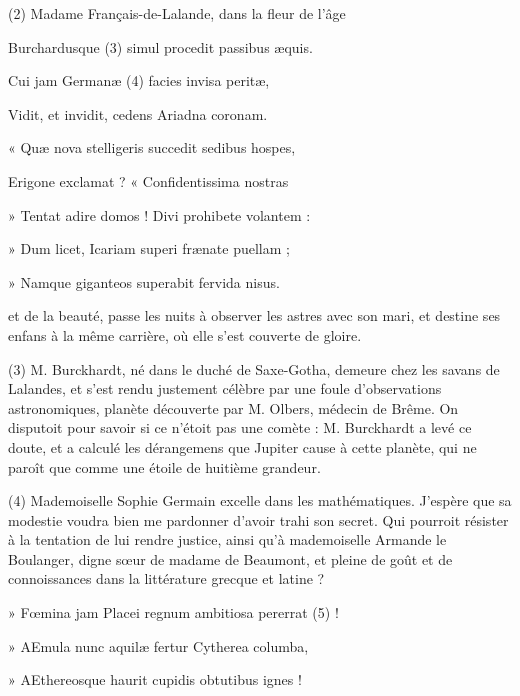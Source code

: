 \documentclass[11pt,a4paper]{article}
\begin{document}
(2) Madame Français-de-Lalande, dans la fleur de l'âge


Burchardusque (3) simul procedit passibus æquis.

Cui jam Germanæ (4) facies invisa peritæ,

Vidit, et invidit, cedens Ariadna coronam.

« Quæ nova stelligeris succedit sedibus hospes,

Erigone exclamat ? « Confidentissima nostras

» Tentat adire domos ! Divi prohibete volantem :

» Dum licet, Icariam superi frænate puellam ;

» Namque giganteos superabit fervida nisus.


et de la beauté, passe les nuits à observer les astres avec son mari, et destine ses enfans à la même carrière, où elle s'est couverte de gloire.

(3) M. Burckhardt, né dans le duché de Saxe-Gotha, demeure chez les savans de Lalandes, et s'est rendu justement célèbre par une foule d'observations astronomiques,  planète découverte par M. Olbers, médecin de Brême. On disputoit pour savoir si ce n'étoit pas une comète : M. Burckhardt a levé ce doute, et a calculé les dérangemens que Jupiter cause à cette planète, qui ne paroît que comme une étoile de huitième grandeur.

(4) Mademoiselle Sophie Germain excelle dans les mathématiques. J'espère que sa modestie voudra bien me pardonner d'avoir trahi son secret. Qui pourroit résister à la tentation de lui rendre justice, ainsi qu'à mademoiselle Armande le Boulanger, digne sœur de madame de Beaumont, et pleine de goût et de connoissances dans la littérature grecque et latine ?


» Fœmina jam Placei regnum ambitiosa pererrat (5) !

» AEmula nunc aquilæ fertur Cytherea columba,

» AEthereosque haurit cupidis obtutibus ignes !
\end{document}
